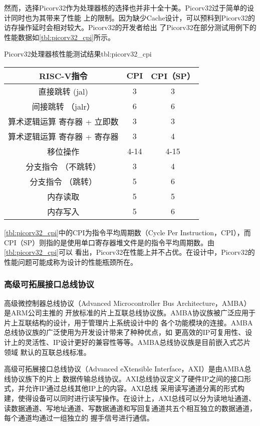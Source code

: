 然而，选择Picorv32作为处理器核的选择也并非十全十美。Picorv32过于简单的设计同时也为其带来了性能
上的限制。因为缺少Cache设计，可以预料到Picorv32的访存操作延时会相对较大。Picorv32的开发者给出
了Picorv32在部分测试用例下的性能数据如\autoref{tbl:picorv32_cpi}所示。

\begin{generaltab}{Picorv32处理器核性能测试结果\cite{picorv32}}{tbl:picorv32_cpi}
  \begin{tabular}{ccc}
    \toprule
    RISC-V指令 & CPI & CPI（SP） \\
    \midrule
    直接跳转 (jal) & 3 & 3 \\
    间接跳转 （jalr） & 6 & 6 \\
    算术逻辑运算 寄存器 + 立即数 & 3 & 3 \\
    算术逻辑运算 寄存器 + 寄存器 & 3 & 4 \\
    移位操作 & 4-14 & 4-15 \\
    分支指令 （不跳转） & 3 & 4 \\
    分支指令 （跳转） & 5 & 6 \\
    内存读取 & 5 & 5 \\
    内存写入 & 5 & 6 \\
    \bottomrule
  \end{tabular}
\end{generaltab}

\autoref{tbl:picorv32_cpi}中的CPI为指令平均周期数（Cycle Per Instruction，CPI），而
CPI（SP）则指的是使用单口寄存器堆文件是的指令平均周期数。由\autoref{tbl:picorv32_cpi}可以
看出，Picorv32在性能上并不占优。在设计中，Picorv32的性能问题可能成称为设计的性能瓶颈所在。

\subsubsection{高级可拓展接口总线协议}

高级微控制器总线协议（Advanced Microcontroller Bus Architecture，AMBA）是ARM公司主推的
开放标准的片上互联总线协议族。AMBA协议族被广泛应用于片上互联结构的设计，用于管理片上系统设计中的
各个功能模块的连接\cite{intro_amba_axi}。AMBA总线协议族的广泛使用为开发设计带来了种种优点，如
更高效的IP可复用性、设计上的灵活性、IP设计更好的兼容性等等。AMBA总线协议族是目前嵌入式芯片领域
默认的互联总线标准。

高级可拓展接口总线协议（Advanced eXtensible Interface，AXI）是由AMBA总线协议族下的片上
数据传输总线协议。AXI总线协议定义了硬件IP之间的接口形式，并允许IP通过总线其他IP上的内容。AXI总线
采用读写通道分离的形式构建，使得设备可以同时进行读写操作。在设计上，AXI总线可以分为读地址通道、
读数据通道、写地址通道、写数据通道和写回复通道共五个相互独立的数据通道，每个通道均通过一组独立的
握手信号进行通信。

